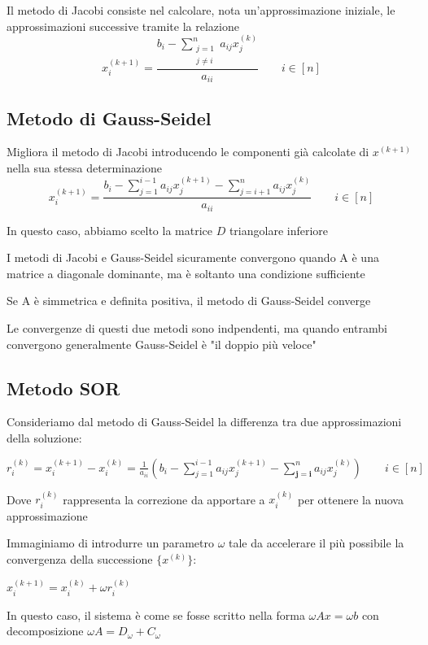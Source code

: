 \documentclass[openany]{book}
\begin{document}
Il metodo di Jacobi consiste nel calcolare, nota un'approssimazione iniziale, le approssimazioni successive 
tramite la relazione
\[ \displaystyle x_i^{(k+1)}=\frac{b_i-\displaystyle\sum^n_{\substack{j=1 \\ j\neq i}}a_{ij}x_j^{(k)}}{a_{ii}} 
\qquad i\in[n] \]
\subsection{Metodo di Gauss-Seidel}

Migliora il metodo di Jacobi introducendo le componenti già calcolate di $x^{(k+1)}$ nella sua stessa 
determinazione
\[ \displaystyle x_i^{(k+1)}=\frac{b_i-\displaystyle\sum_{j=1}^{i-1}a_{ij}x_j^{(k+1)}
-\displaystyle\sum^n_{j=i+1}a_{ij}x_j^{(k)}}{a_{ii}} \qquad i\in[n] \]

In questo caso, abbiamo scelto la matrice $D$ triangolare inferiore

I metodi di Jacobi e Gauss-Seidel sicuramente convergono quando A è una matrice a diagonale dominante, ma è 
soltanto una condizione sufficiente

Se A è simmetrica e definita positiva, il metodo di Gauss-Seidel converge

Le convergenze di questi due metodi sono indpendenti, ma quando entrambi convergono generalmente Gauss-Seidel 
è "il doppio più veloce"
\subsection{Metodo SOR}

Consideriamo dal metodo di Gauss-Seidel la differenza tra due approssimazioni della soluzione: 

$r_i^{(k)}=x_i^{(k+1)}-x_i^{(k)}=\frac{1}{a_{ii}}\left( b_i-\sum_{j=1}^{i-1}a_{ij}x_j^{(k+1)} 
- \sum_{\boldsymbol{j=i}}^na_{ij}x_j^{(k)} \right) \qquad i\in[n]$

Dove $r_i^{(k)}$ rappresenta la correzione da apportare a $x_i^{(k)}$ per ottenere la nuova approssimazione

Immaginiamo di introdurre un parametro $\omega$ tale da accelerare il più possibile la convergenza della 
successione $\{x^{(k)}\}$:

$x_i^{(k+1)}=x_i^{(k)}+\omega r_i^{(k)}$

In questo caso, il sistema è come se fosse scritto nella forma $\omega Ax=\omega b$ con decomposizione 
$\omega A = D_\omega + C_\omega$
\end{document}

